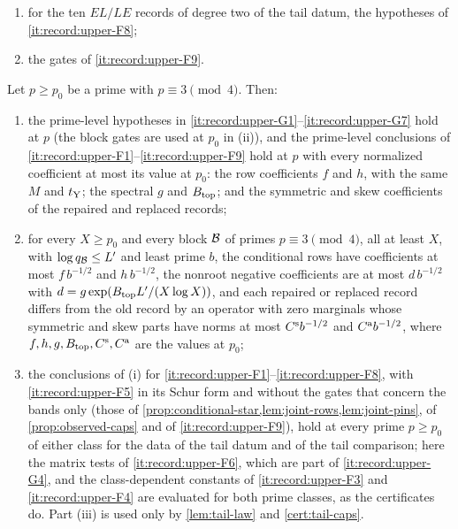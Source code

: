 \begin{lemma}
\begin{enumerate}[label=\textup{(G\arabic*)}]
\item\label{it:record:upper-G6} for the ten $EL/LE$ records of degree two of the
 tail datum, the hypotheses of \ref{it:record:upper-F8};
\item\label{it:record:upper-G7} the gates of \ref{it:record:upper-F9}.
\end{enumerate}
Let $p\ge p_0$ be a prime with $p\equiv3\pmod4$. Then:
\begin{enumerate}[label=(\roman*)]
\item the prime-level hypotheses in
 \ref{it:record:upper-G1}--\ref{it:record:upper-G7} hold at $p$
 (the block gates are used at $p_0$ in (ii)), and the prime-level conclusions
 of \ref{it:record:upper-F1}--\ref{it:record:upper-F9}
 hold at $p$ with every normalized coefficient at most its value at $p_0$:
 the row coefficients $f$ and $h$, with the same $M$ and $t_{\rm Y}$; the spectral $g$
 and $B_{\rm top}$; and the symmetric and skew coefficients of the repaired and
 replaced records;
\item for every $X\ge p_0$ and every block $\mathcal B$ of primes $p\equiv3\pmod4$,
 all at least $X$, with $\log q_\mathcal B\le L'$ and least prime $b$, the conditional rows
 have coefficients at most $f\,b^{-1/2}$ and $h\,b^{-1/2}$, the nonroot
 negative coefficients are at most $d\,b^{-1/2}$ with
 $d=g\exp(B_{\rm top}L'/(X\log X))$, and each repaired or replaced record differs
 from the old record by an operator with zero marginals whose symmetric and skew
 parts have norms at most $C^{\rm s}b^{-1/2}$ and $C^{\rm a}b^{-1/2}$, where
 $f,h,g,B_{\rm top},C^{\rm s},C^{\rm a}$ are the values at $p_0$;
\item the conclusions of (i) for \ref{it:record:upper-F1}--\ref{it:record:upper-F8},
 with \ref{it:record:upper-F5} in its Schur form and without the gates that concern
 the bands only (those of \cref{prop:conditional-star,lem:joint-rows,lem:joint-pins},
 of \cref{prop:observed-caps} and of \ref{it:record:upper-F9}), hold at every prime
 $p\ge p_0$ of either class for the data of the tail datum and of the tail
 comparison; here the matrix tests of \ref{it:record:upper-F6}, which are part of
 \ref{it:record:upper-G4}, and the class-dependent constants of
 \ref{it:record:upper-F3} and \ref{it:record:upper-F4} are evaluated for both prime
 classes, as the certificates do. Part (iii) is used only by \cref{lem:tail-law}
 and \cref{cert:tail-caps}.
\end{enumerate}
\end{lemma}

